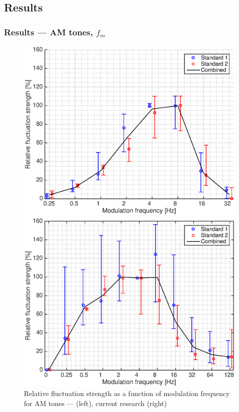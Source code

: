 \documentclass{beamer}
\begin{document}
\subsection{Results}
\begin{frame}
  \frametitle{Results --- AM tones, $f_m$}
  \begin{figure}
    \centering
    \begin{minipage}{0.45\textwidth}
      \includegraphics[width=\textwidth]{Fastl2007_AM-fm}
    \end{minipage}
    \hfill
    \begin{minipage}{0.45\textwidth}
      \includegraphics[width=\textwidth]{Garcia2015_AM-fm}
    \end{minipage}
    \caption{Relative fluctuation strength as a function of modulation
    frequency for AM tones --- \citeauthor{Fastl2007Psychoacoustics} (left),
    current research (right)}
  \end{figure}
\end{frame}
\end{document}
